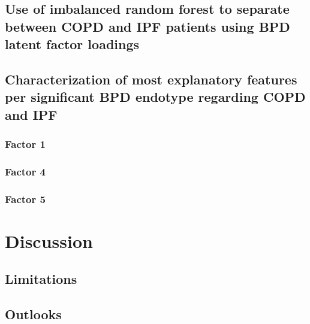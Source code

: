     \subsection{Use of imbalanced random forest to separate between COPD and IPF patients using BPD latent factor loadings}
    \subsection{Characterization of most explanatory features per significant BPD endotype regarding COPD and IPF}
        \subsubsection{Factor 1}
        \subsubsection{Factor 4}
        \subsubsection{Factor 5}

\section{Discussion}
    \subsection{Limitations}
    \subsection{Outlooks}